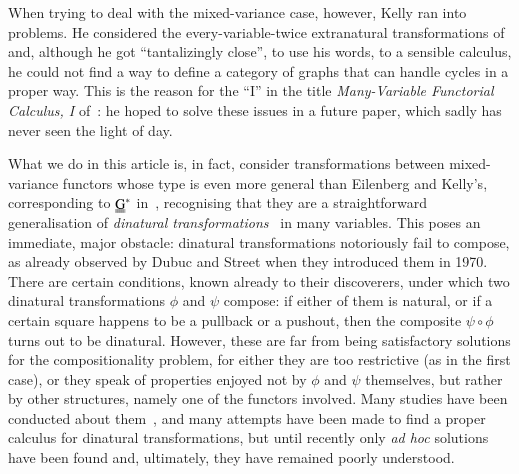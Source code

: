 When trying to deal with the mixed-variance case, however, Kelly ran into problems. He considered the every-variable-twice extranatural transformations of~\cite{eilenberg_generalization_1966} and, although he got ``tantalizingly close'', to use his words, to a sensible calculus, he could not find a way to define a category of graphs that can handle cycles in a proper way. This is the reason for the ``I'' in the title \emph{Many-Variable Functorial Calculus, I} of~\cite{kelly_many-variable_1972}: he hoped to solve these issues in a future paper, which sadly has never seen the light of day.

What we do in this article is, in fact, consider transformations between mixed-variance functors whose type is even more general than Eilenberg and Kelly's, corresponding to $\text{\uuline{G}}^*$ in~\cite{kelly_many-variable_1972}, recognising that they are a straightforward generalisation of \emph{dinatural transformations}~\cite{dubuc_dinatural_1970} in many variables. This poses an immediate, major obstacle: dinatural transformations notoriously fail to compose, as already observed by Dubuc and Street when they introduced them in 1970. There are certain conditions, known already to their discoverers, under which two dinatural transformations $\phi$ and $\psi$ compose: if either of them is natural, or if a certain square happens to be a pullback or a pushout, then the composite $\psi\circ\phi$ turns out to be dinatural. However, these are far from being satisfactory solutions for the compositionality problem, for either they are too restrictive (as in the first case), or they speak of properties enjoyed not by $\phi$ and $\psi$ themselves, but rather by other structures, namely one of the functors involved.  Many studies have been conducted about them~\cite{bainbridge_functorial_1990,blute_linear_1993,freyd_dinaturality_1992,girard_normal_1992,lataillade_dinatural_2009,mulry_categorical_1990,pare_dinatural_1998,pistone_dinaturality_2017,plotkin_logic_1993,simpson_characterisation_1993,wadler_theorems_1989}, and many attempts have been made to find a proper calculus for dinatural transformations, but until recently only \emph{ad hoc} solutions have been found and, ultimately, they have remained poorly understood.


